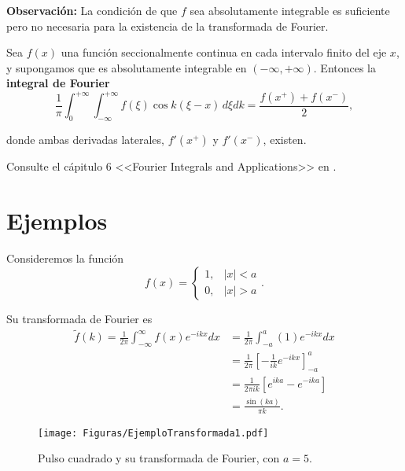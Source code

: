 \textbf{Observación:} La condición de que $f$ sea absolutamente integrable es suficiente pero no necesaria para la existencia de la transformada de Fourier.

\begin{teorema}
    Sea $f(x)$ una función seccionalmente continua en cada intervalo finito del eje $x$, y supongamos que es absolutamente integrable en $(-\infty, + \infty)$. Entonces la \textbf{integral de Fourier}
$$
\frac{1}{\pi} \int_0^{+\infty} \int_{-\infty}^{+\infty} f(\xi) \cos k(\xi-x) \,d\xi dk = \frac{f(x^+) + f(x^-)}{2},
$$

donde ambas derivadas laterales, $f'(x^+)$ y $f'(x^-)$, existen.
\end{teorema}

\begin{demo}
Consulte el cápitulo 6 <<Fourier Integrals and Applications>> en \cite{Brown}.
\end{demo}

\section{Ejemplos}

\begin{ejemplo} \label{PulsoCuadrado}
Consideremos la función 
$$f(x) = \left\{ \begin{array}{cl}
     1,& |x|<a  \\
     0,& |x|> a
\end{array} \right..$$

Su transformada de Fourier es 
\begin{align}
    \tilde{f}(k) = \frac{1}{2\pi} \int_{-\infty}^{\infty} f(x) e^{-ikx} dx &= \frac{1}{2\pi}\int_{-a}^a (1)  e^{-ikx} dx \nonumber \\
    &= \frac{1}{2\pi} \left[ - \frac{1}{ik} e^{-ikx} \right]_{-a}^a \nonumber\\
    &= \frac{1}{2\pi i k} [e^{ika} - e^{-ika}] \nonumber\\
    &= \frac{\sin(ka)}{\pi k}. \label{TransPulsoCuadrado}
\end{align}

\begin{figure}[H]
    \centering
    \texttt{[image: Figuras/EjemploTransformada1.pdf]}
    \caption{Pulso cuadrado y su transformada de Fourier, con $a = 5$.}
    \label{Espectro2}
\end{figure}

\end{ejemplo}

